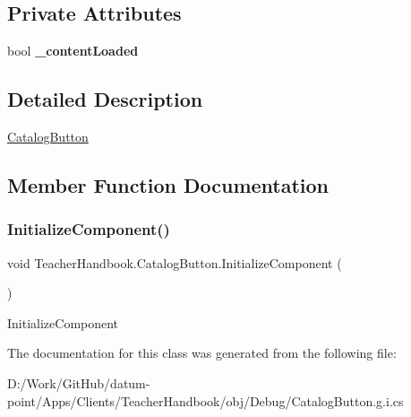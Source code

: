 \subsection*{Private Attributes}
\begin{DoxyCompactItemize}
\item 
\mbox{\label{class_teacher_handbook_1_1_catalog_button_a841881f1c8ba418ddd09ae373f0a51aa}} 
bool {\bfseries \+\_\+content\+Loaded}
\end{DoxyCompactItemize}


\subsection{Detailed Description}
\mbox{\hyperlink{class_teacher_handbook_1_1_catalog_button}{Catalog\+Button}} 



\subsection{Member Function Documentation}
\mbox{\label{class_teacher_handbook_1_1_catalog_button_adb12d2ac86d6ce2674849f4fde4d4517}} 
\subsubsection{\texorpdfstring{Initialize\+Component()}{InitializeComponent()}}
{\footnotesize\ttfamily void Teacher\+Handbook.\+Catalog\+Button.\+Initialize\+Component (\begin{DoxyParamCaption}{ }\end{DoxyParamCaption})}



Initialize\+Component 



The documentation for this class was generated from the following file\+:\begin{DoxyCompactItemize}
\item 
D\+:/\+Work/\+Git\+Hub/datum-\/point/\+Apps/\+Clients/\+Teacher\+Handbook/obj/\+Debug/Catalog\+Button.\+g.\+i.\+cs\end{DoxyCompactItemize}

